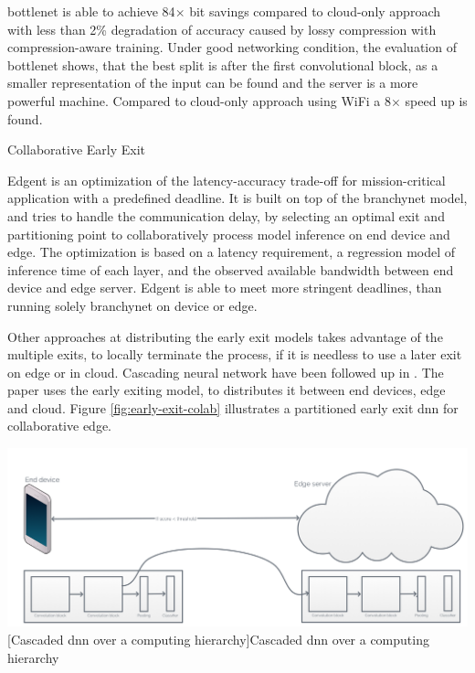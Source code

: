 \begin{enumdescript}
	\gls{bottlenet} is able to achieve 84$\times$ bit savings compared to cloud-only approach with less than 2\% degradation of accuracy caused by lossy compression with compression-aware training. Under good networking condition, the evaluation of \gls{bottlenet} shows, that the best split is after the first convolutional block, as a smaller representation of the input can be found and the server is a more powerful machine. Compared to cloud-only approach using WiFi a 8$\times$ speed up is found. 
	
	\item[Collaborative Early Exit]
	
	Edgent \cite{li_edge_2018} is an optimization of the latency-accuracy trade-off for mission-critical application with a predefined deadline. It is built on top of the \gls{branchynet} model, and tries to handle the communication delay, by selecting an optimal exit and partitioning point to collaboratively process model inference on end device and edge. The optimization is based on a latency requirement, a regression model of inference time of each layer, and the observed available bandwidth between end device and edge server. Edgent is able to meet more stringent deadlines, than running solely \gls{branchynet} on device or edge. 
	
	Other approaches at distributing the early exit models takes advantage of the multiple exits, to locally terminate the process, if it is needless to use a later exit on edge or in cloud. Cascading neural network have been followed up in \cite{leroux_cascading_2017}. The paper uses the early exiting model, to distributes it between end devices, edge and cloud. Figure \ref{fig:early-exit-colab} illustrates a partitioned early exit \gls{dnn} for collaborative edge. 
	
	\begin{minipage}[t]{\linewidth}
		\centering
		\includegraphics[width=\linewidth]{figures/models/cascaded}
		[Cascaded \gls{dnn} over a computing hierarchy]{Cascaded \gls{dnn} over a computing hierarchy}
		\label{fig:early-exit-colab}
	\end{minipage}


\end{enumdescript}
